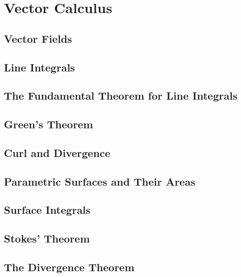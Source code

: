 \setcounter{chapter}{12}
\chapter{Vector Calculus}
    \section{Vector Fields}
    \section{Line Integrals}
    \section{The Fundamental Theorem for Line Integrals}
    \section{Green’s Theorem}
    \section{Curl and Divergence}
    \section{Parametric Surfaces and Their Areas}
    \section{Surface Integrals}
    \section{Stokes’ Theorem}
    \section{The Divergence Theorem}